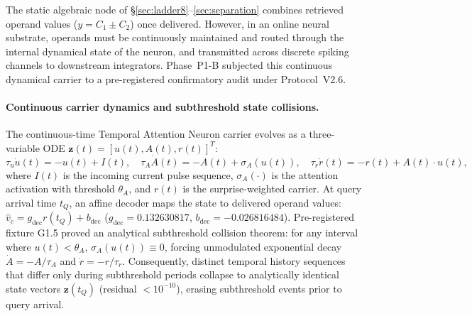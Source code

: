 The static algebraic node of \S\ref{sec:ladder8}--\ref{sec:separation} combines
retrieved operand values ($y = C_1 \pm C_2$) once delivered. However, in an online
neural substrate, operands must be continuously maintained and routed through the
internal dynamical state of the neuron, and transmitted across discrete spiking channels
to downstream integrators. Phase~P1-B subjected this continuous dynamical carrier to a pre-registered
confirmatory audit under Protocol~V2.6.

\paragraph{Continuous carrier dynamics and subthreshold state collisions.}
The continuous-time Temporal Attention Neuron carrier evolves as a three-variable ODE
$\mathbf{z}(t) = [u(t), A(t), r(t)]^T$:
\begin{equation}
\tau_u \dot{u}(t) = -u(t) + I(t), \quad
\tau_A \dot{A}(t) = -A(t) + \sigma_A(u(t)), \quad
\tau_r \dot{r}(t) = -r(t) + A(t) \cdot u(t),
\label{eq:p1b_carrier}
\end{equation}
where $I(t)$ is the incoming current pulse sequence, $\sigma_A(\cdot)$ is the
attention activation with threshold $\theta_A$, and $r(t)$ is the surprise-weighted
carrier. At query arrival time $t_Q$, an affine decoder maps the state to delivered operand values:
$\hat{v}_c = g_{\text{dec}} r(t_Q) + b_{\text{dec}}$ ($g_{\text{dec}} = 0.132630817$, $b_{\text{dec}} = -0.026816484$).
Pre-registered fixture G1.5 proved an analytical subthreshold collision theorem: for any interval where $u(t) < \theta_A$,
$\sigma_A(u(t)) \equiv 0$, forcing unmodulated exponential decay $\dot{A} = -A/\tau_A$ and $\dot{r} = -r/\tau_r$.
Consequently, distinct temporal history sequences that differ only during subthreshold periods collapse to analytically identical state vectors $\mathbf{z}(t_Q)$ (residual $< 10^{-10}$), erasing subthreshold events prior to query arrival.

